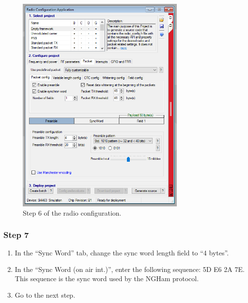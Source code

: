 \begin{figure}[!h]
	\begin{center}
		\includegraphics[width=0.75\textwidth]{figures/wds-tutorial/wds-tutorial-6.png}
		\caption{Step 6 of the radio configuration.}
		\label{fig:wds-tutorial-step-6}
	\end{center}
\end{figure}

\subsubsection{Step 7}

\begin{enumerate}
    \item In the ``Sync Word'' tab, change the sync word length field to ``4 bytes''.
    \item In the ``Sync Word (on air int.)'', enter the following sequence: 5D E6 2A 7E. This sequence is the sync word used by the NGHam protocol.
    \item Go to the next step.
\end{enumerate}

